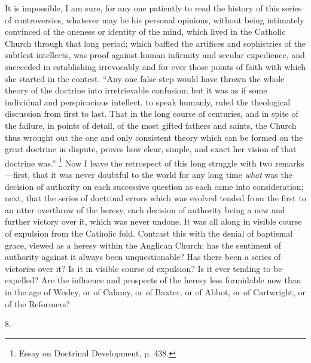 It is impossible, I am sure, for any one patiently to read the
history of this series of controversies, whatever may be his personal
opinions, without being intimately convinced of the oneness or
identity of the mind, which lived in the Catholic Church through that
long period; which baffled the artifices and sophistries of the
subtlest intellects, was proof against human infirmity and secular
expedience, and succeeded in establishing irrevocably and for ever
those points of faith with which she started in the contest. ``Any
one false step would have thrown the whole theory of the doctrine into
irretrievable confusion; but it was as if some individual and
perspicacious intellect, to speak humanly, ruled the theological
discussion from first to last. That in the long course of centuries,
and in spite of the failure, in points of detail, of the most gifted
fathers and saints, the Church thus wrought out the one and only
consistent theory which can be formed on the great doctrine in
dispute, proves how clear, simple, and exact her vision of that
doctrine was.'' \footnote{Essay on Doctrinal
Development, p. 438.} Now
I leave the retrospect of this long struggle with two remarks—first,
that it was never doubtful to the world for any long time \emph{what}
was the decision of authority on each successive question as each came
into consideration; next, that the series of doctrinal errors which
was evolved tended from the first to an utter overthrow of the heresy,
each decision of authority being a new and further victory over it,
which was never undone. It was all along in visible course of
expulsion from the Catholic fold. Contrast this with the denial of
baptismal grace, viewed as a heresy within the Anglican Church; has
the sentiment of authority against it always been unquestionable? Has
there been a series of victories over it? Is it in visible course of
expulsion? Is it ever tending to be expelled? Are the influence and
prospects of the heresy less formidable now than in the age of Wesley,
or of Calamy, or of Baxter, or of Abbot, or of Cartwright, or of the
Reformers?

8.

